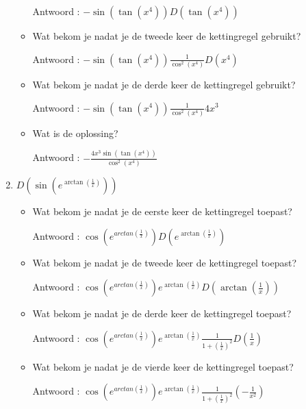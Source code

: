 \documentclass{article}
\begin{document}
\begin{enumerate}
\begin{itemize}
Antwoord : $-\sin \left( \tan \left(  x^4  \right)  \right)D \left( \tan \left( x^4  \right)  \right)$

\item Wat bekom je nadat je de tweede keer de kettingregel gebruikt?

Antwoord : $-\sin \left( \tan \left(  x^4  \right)  \right)\frac{1}{\cos^2 \left( x^4  \right)}D\left(  x^4 \right)$

\item Wat bekom je nadat je de derde keer de kettingregel gebruikt?

Antwoord :  $-\sin \left( \tan \left(  x^4  \right)  \right)\frac{1}{\cos^2 \left( x^4  \right)}4x^3$

\item Wat is de oplossing?

Antwoord : $-\frac{4x^3\sin \left( \tan \left(  x^4  \right)  \right)}{\cos^2 \left( x^4  \right)}$

\end{itemize}

\item $D \left(  \sin \left(  e^{\arctan \left(  \frac{1}{x}  \right) } \right)  \right)$

\begin{itemize}

\item Wat bekom je nadat je de eerste keer de kettingregel toepast?

Antwoord : $\cos \left(  e^{arctan \left(  \frac{1}{x}  \right) } \right) D \left(  e^{\arctan \left(  \frac{1}{x}  \right) }  \right)$

\item Wat bekom je nadat je de tweede keer de kettingregel toepast?

Antwoord : $\cos \left(  e^{arctan \left(  \frac{1}{x}  \right) } \right) e^{\arctan \left(  \frac{1}{x}  \right) }D \left( \arctan \left(  \frac{1}{x}  \right)  \right)$

\item Wat bekom je nadat je de derde keer de kettingregel toepast?

Antwoord : $\cos \left(  e^{arctan \left(  \frac{1}{x}  \right) } \right) e^{\arctan \left(  \frac{1}{x}  \right) }\frac{1}{1+\left( \frac{1}{x}  \right)^2}D\left( \frac{1}{x}  \right)$

\item Wat bekom je nadat je de vierde keer de kettingregel toepast?

Antwoord :  $\cos \left(  e^{arctan \left(  \frac{1}{x}  \right) } \right) e^{\arctan \left(  \frac{1}{x}  \right) }\frac{1}{1+\left( \frac{1}{x}  \right)^2}\left( -\frac{1}{x^2}  \right)$


\end{itemize}
\end{enumerate}
\end{document}
